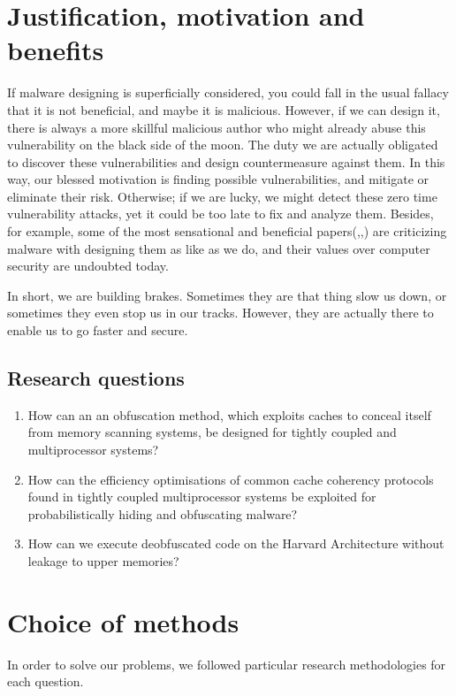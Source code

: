 \section{Justification, motivation and benefits}
If malware designing is superficially considered, you could fall in the usual fallacy that it is not beneficial, and maybe it is malicious. However, if we can design it, there is always a more skillful malicious author who might already abuse this vulnerability on the black side of the moon. The duty we are actually obligated to discover these vulnerabilities and design countermeasure against them. In this way, our blessed motivation is finding possible vulnerabilities, and mitigate or eliminate their risk. Otherwise; if we are lucky, we might detect these zero time vulnerability attacks, yet it could be too late to fix and analyze them. Besides, for example, some of the most sensational and beneficial papers(\cite{moser2007limits},\cite{cavallaro2008limits},\cite{egele2012survey}) are criticizing malware with designing them as like as we do, and their values over computer security are undoubted today. 

In short, we are building brakes. Sometimes they are that thing slow us down, or sometimes they even stop us in our tracks. However, they are actually there to enable us to go faster and secure.

\subsection{Research questions}\label{research:questions}
\begin{enumerate}
	\item How can an an obfuscation method, which exploits caches to conceal itself from memory scanning systems, be designed for tightly coupled and multiprocessor systems?
	\item How can the efficiency optimisations of common cache coherency protocols found in tightly coupled multiprocessor systems be exploited for probabilistically hiding and obfuscating malware?
	\item How can we execute deobfuscated code on the Harvard Architecture without leakage to upper memories?
\end{enumerate}


\section{Choice of methods}
	In order to solve our problems, we followed particular research methodologies for each question.

